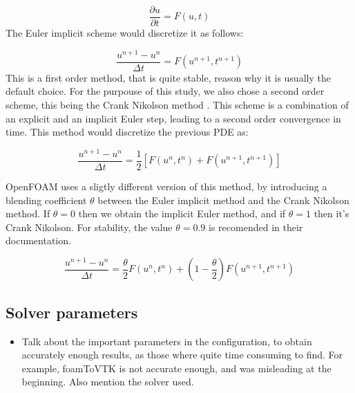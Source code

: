 \documentclass[
  english,        %
  font=times,     %
  onecolumn,      %
]{tumarticle}
\begin{document}
\begin{equation}
    \frac{\partial u}{\partial t} = F(u, t)
\end{equation}
The Euler implicit scheme would discretize it as follows:

\begin{equation}
    \frac{u^{n+1} - u^n}{\Delta t} = {F}(u^{n+1}, t^{n+1})
\end{equation}
This is a first order method, that is quite stable, reason why it is usually the default choice. For the purpouse of this study, we also chose a second order scheme, this being the Crank Nikolson method \cite{crank1947practical}. This scheme is a combination of an explicit and an implicit Euler step, leading to a second order convergence in time. This method would discretize the previous PDE as: 

\begin{equation}
    \frac{u^{n+1} - u^n}{\Delta t} = \frac{1}{2} \left[F(u^n, t^n) +  F(u^{n+1}, t^{n+1}) \right]
\end{equation}


OpenFOAM uses a sligtly different version of this method, by introducing a blending coefficient $\theta$ between the Euler implicit method and the Crank Nikolson method. If $\theta = 0$ then we obtain the implicit Euler method, and if $\theta = 1$ then it's Crank Nikolson. For stability, the value $\theta = 0.9$ is recomended in their documentation.

\begin{equation}
    \frac{u^{n+1} - u^n}{\Delta t} = \frac{\theta}{2} F(u^{n}, t^{n}) + \left( 1 - \frac{\theta}{2} \right) F(u^{n+1}, t^{n+1})
\end{equation}



\subsection{Solver parameters}
\begin{itemize}
    \item Talk about the important parameters in the configuration, to obtain accurately enough results, as those where quite time consuming to find. For example, foamToVTK is not accurate enough, and was misleading at the beginning. Also mention the solver used.
\end{itemize}
\end{document}
